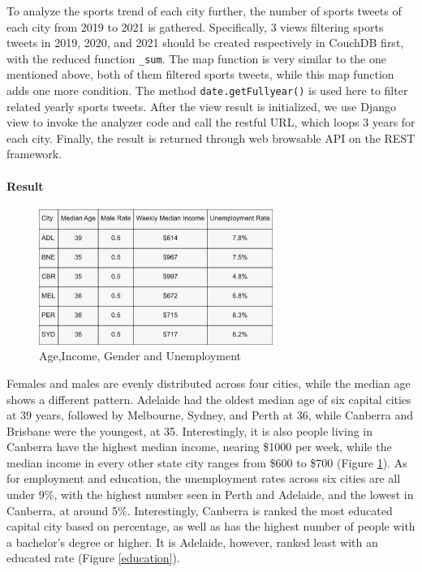 To analyze the sports trend of each city further, the number of sports tweets of each city from 2019 to 2021 is gathered. Specifically, 3 views filtering sports tweets in 2019, 2020, and 2021 should be created respectively in CouchDB first, with the reduced function \texttt{_sum}. The map function is very similar to the one mentioned above, both of them filtered sports tweets, while this map function adds one more condition. The method \texttt{date.getFullyear()} is used here to filter related yearly sports tweets. After the view result is initialized, we use Django view to invoke the analyzer code and call the restful URL, which loops 3 years for each city. Finally, the result is returned through web browsable API on the REST framework. 



\paragraph{Result}

\begin{figure}[H]
\centerline{\includegraphics[width=3in]{Figures/age,income,gender.jpg}}
\caption{Age,Income, Gender and Unemployment\label{Age,Income, Gender and Unemployment}}
\end{figure}


Females and males are evenly distributed across four cities, while the median age shows a different pattern. Adelaide had the oldest median age of six capital cities at 39 years, followed by Melbourne, Sydney, and Perth at 36, while Canberra and Brisbane were the youngest, at 35. Interestingly, it is also people living in Canberra have the highest median income, nearing \$1000 per week, while the median income in every other state city ranges from \$600 to \$700 (Figure \ref{Age,Income, Gender and Unemployment}). As for employment and education, the unemployment rates across six cities are all under 9\%, with the highest number seen in Perth and Adelaide, and the lowest in Canberra, at around 5\%. Interestingly, Canberra is ranked the most educated capital city based on percentage, as well as has the highest number of people with a bachelor’s degree or higher. It is Adelaide, however, ranked least with an educated rate (Figure \ref{education}). 

